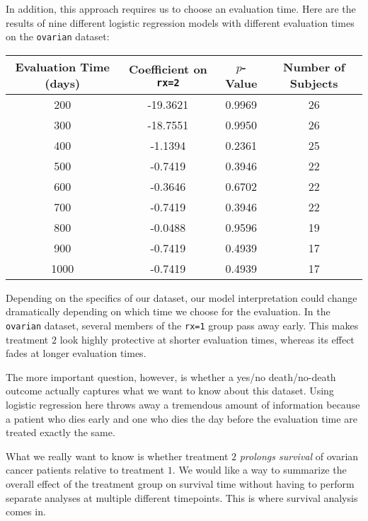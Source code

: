 In addition, this approach requires us to choose an evaluation time. Here are the results of nine different logistic regression models with different evaluation times on the \texttt{ovarian} dataset:
\begin{center}
{\small
\begin{tabular}{cccc}
  \toprule
  Evaluation Time (days) & Coefficient on \texttt{rx=2} & $p$-Value & Number of Subjects \\ 
  \midrule
  200 & -19.3621 & 0.9969 & 26 \\ 
  300 & -18.7551 & 0.9950 & 26 \\ 
  400 & -1.1394 & 0.2361 & 25 \\ 
  500 & -0.7419 & 0.3946 & 22 \\ 
  600 & -0.3646 & 0.6702 & 22 \\ 
  700 & -0.7419 & 0.3946 & 22 \\ 
  800 & -0.0488 & 0.9596 & 19 \\ 
  900 & -0.7419 & 0.4939 & 17 \\ 
  1000 & -0.7419 & 0.4939 & 17 \\ 
  \bottomrule
\end{tabular}
}
\end{center}
Depending on the specifics of our dataset, our model interpretation could change dramatically depending on which time we choose for the evaluation. In the \texttt{ovarian} dataset, several members of the \texttt{rx=1} group pass away early. This makes treatment $2$ look highly protective at shorter evaluation times, whereas its effect fades at longer evaluation times.

The more important question, however, is whether a yes/no death/no-death outcome actually captures what we want to know about this dataset. Using logistic regression here throws away a tremendous amount of information because a patient who dies early and one who dies the day before the evaluation time are treated exactly the same. 

What we really want to know is whether treatment $2$ \emph{prolongs survival} of ovarian cancer patients relative to treatment $1$. We would like a way to summarize the overall effect of the treatment group on survival time without having to perform separate analyses at multiple different timepoints. This is where survival analysis comes in.